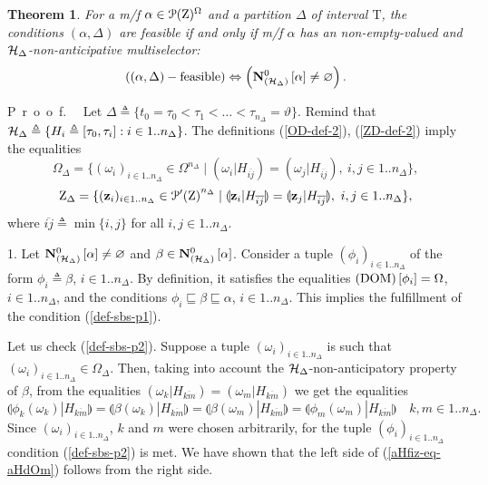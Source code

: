 \documentclass[sn-mathphys,Numbered,pdflatex]{sn-jnl}%
\theoremstyle{thmstyleone}%
\newtheorem{theorem}{Theorem}%
\theoremstyle{thmstyletwo}%
\theoremstyle{thmstylethree}%
\renewcommand{\proof}{\par\mbox{P r o o f.}\ \ }
\newcommand{\nint}[2]{{{#1}..{#2}}}%
\newcommand{\beq}{\begin{equation}}
\newcommand{\eeq}{\end{equation}}
\newcommand{\mydef}{\mathrel{\triangleq}}%
\newcommand{\icP}[1]{\EuScript{P}({#1})}%
\newcommand{\icPp}[1]{\EuScript{P^\prime}({#1})}%
\newcommand{\res}[2]{\ensuremath{(#1|#2)}}%
\newcommand{\myeqv}{\ensuremath{\mathrel{\Leftrightarrow}}}%
\newcommand{\myLe}{\mathrel{\sqsubseteq}}%
\newcommand{\naOm}{\ensuremath{\Omega}}%
\newcommand{\naZ}{\ensuremath{\mathrm{Z}}}%
\newcommand{\naT}{\ensuremath{\mathrm{T}}}%
\newcommand{\AnaNO}[2]{\mathbf{N}^0_{(#1)}\setbox0=\hbox{\text{$#2$}}\ifdim\wd0=0pt\else\left[{#2}\right]\fi}%
\newcommand{\nado}[1]{(\mathrm{DOM})\setbox0=\hbox{\text{$#1$}}\ifdim\wd0=0pt\else\left[{#1}\right]\fi}%
\newcommand{\sres}[2]{\llparenthesis#1|#2\rrparenthesis}%
\newcommand{\fref}[1]{{\rm(\ref{#1})}}   %
\begin{document}
\begin{theorem}
\label{lem-aHfiz-eq-aHdOm}
For a m/f $\alpha\in\icP\naZ^\naOm$ and a partition $\Delta$ of interval $\naT$, the conditions $(\alpha,\Delta)$ are feasible if and only if m/f $\alpha$ has an non-empty-valued and ${\cal H}_\Delta$-non-anticipative multiselector:
\beq\label{aHfiz-eq-aHdOm}
\left((\alpha,\Delta)-\text{feasible}\right)\myeqv\left(\AnaNO{{\cal H}_\Delta}\alpha\neq\varnothing\right).
\eeq
\end{theorem}
\proof
Let $\Delta\mydef\{t_0=\tau_0<\tau_1<\ldots<\tau_{n_ \Delta}=\vartheta\}$.
Remind that ${\cal H}_\Delta\mydef\{H_i\mydef[\tau_0,\tau_i]: i\in\nint1{n_\Delta}\}$.
The definitions \fref{OD-def-2}, \fref{ZD-def-2} imply the equalities
\beq\label{OD-def}
\naOm_\Delta=\{(\omega_i)_{i\in\nint1{n_\Delta}}\in\naOm^{n_\Delta}\mid\res{\omega_i}{H_{ \overline{ij}}}=\res{\omega_j}{H_{\overline{ij}}},\ i,j\in\nint1{n_\Delta}\},
\eeq
\beq\label{ZD-def}
\naZ_\Delta=\{({\bf z}_i)_{i\in\nint1{n_\Delta}}\in{\icPp\naZ}^{n_\Delta}\mid\sres{{\bf z}_i}{H_{\overline{ij}}}=\sres{{\bf z}_j}{H_{\overline{ij}}},\ i ,j\in\nint1{n_\Delta}\},
\eeq
where $\overline{ij}\mydef\min\{i,j\}$ for all $i,j\in\nint1{n_\Delta}$.

1.
Let $\AnaNO{{\cal H}_\Delta}\alpha\neq\varnothing$ and $\beta\in\AnaNO{{\cal H}_\Delta}\alpha$.
Consider a tuple $(\phi_i)_{i\in\nint1{n_\Delta}}$ of the form $\phi_i\mydef\beta$, $i\in\nint1{n_\Delta}$.
By definition, it satisfies the equalities $\nado{\phi_i}=\naOm$, $i\in\nint1{n_\Delta}$, and the conditions $\phi_i\myLe\beta\myLe\alpha$, $i\in\nint1{n_ \Delta}$.
This implies the fulfillment of the condition \fref{def-sbs-p1}.

Let us check \fref{def-sbs-p2}.
Suppose a tuple $(\omega_i)_{i\in\nint1{n_\Delta}}$ is such that $(\omega_i)_{i\in\nint1{n_\Delta}}\in\naOm_\Delta$.
Then, taking into account the ${\cal H}_\Delta$-non-anticipatory property of $\beta$, from the equalities $\res{\omega_k}{H_{\overline{km}}} =\res{\omega_m}{H_{\overline{km}}}$ we get the equalities
$$
\sres{\phi_k(\omega_k)}{H_{\overline{km}}} =\sres{\beta(\omega_k)}{H_{\overline{km}}} =\sres{\beta(\omega_m)}{H_{\overline{km}}} =\sres{\phi_m(\omega_m)}{H_{\overline{km}}}\quad k,m\in\nint1{n_\Delta}.
$$
Since $(\omega_i)_{i\in\nint1{n_\Delta}}$, $k$ and $m$ were chosen arbitrarily, for the tuple $(\phi_i)_{i\in\nint1{n_\Delta }}$ condition \fref{def-sbs-p2} is met.
We have shown that the left side of \fref{aHfiz-eq-aHdOm} follows from the right side.
\end{document}
